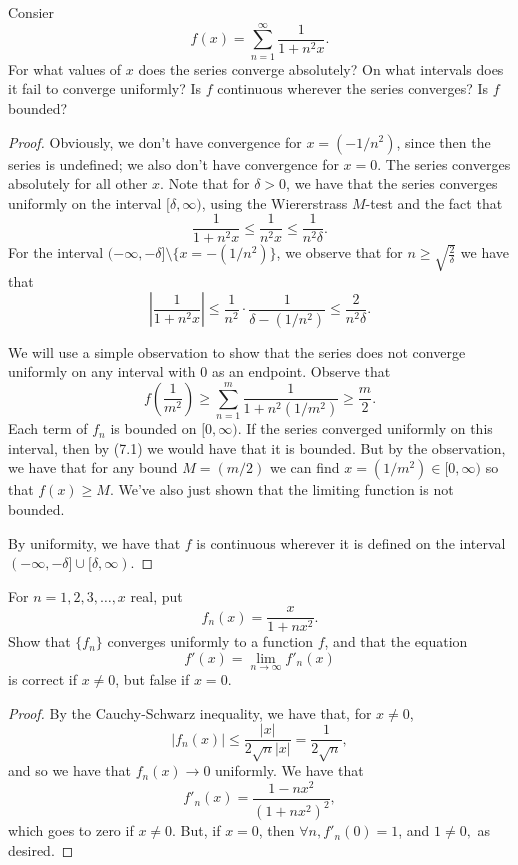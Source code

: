 \documentclass{assignment}
\begin{document}
\begin{question}[7.4]
 Consier $$f(x) = \sum_{n=1}^\infty \frac{1}{1+n^2x}.$$ For what values of $x$ does the series
converge absolutely? On what intervals does it fail to converge uniformly? Is $f$ continuous
wherever the series converges? Is $f$ bounded? 
\end{question}
\begin{proof}
 Obviously, we don't have convergence for $x = (-1 / n^2)$, since then the series is undefined; we
also don't have convergence for $x = 0$. The series converges absolutely for all other $x$. Note
that for $\delta > 0$, we have that the series converges uniformly on the interval $[\delta,
\infty)$, using the Wiererstrass $M$-test and the fact that 
$$\frac{1}{1 + n^2x} \leq \frac{1}{n^2x} \leq \frac{1}{n^2\delta}.$$
For the interval $(-\infty, -\delta] \setminus \{x = -(1/n^2)\}$, we observe that for $n \geq
\sqrt{\frac{2}{\delta}}$ we have that 
$$\left| \frac{1}{1+n^2x} \right| \leq \frac{1}{n^2}\cdot \frac{1}{\delta - (1/n^2)} \leq
\frac{2}{n^2\delta}.$$

We will use a simple observation to show that the series does not converge uniformly on any interval
with 0 as an endpoint. Observe that 
$$f \left( \frac{1}{m^2} \right) \geq \sum_{n=1}^m \frac{1}{1 + n^2(1/m^2)} \geq \frac{m}{2}.$$
Each term of $f_n$ is bounded on $[0, \infty)$. If the series converged uniformly on this interval,
then by (7.1) we would have that it is bounded. But by the observation, we have that for any bound
$M = (m/2)$ we can find $x = (1/m^2) \in [0, \infty)$ so that $f(x) \geq M$. We've also just shown
that the limiting function is not bounded. 

By uniformity, we have that $f$ is continuous wherever it is defined on the interval $(-\infty,
-\delta] \cup [\delta, \infty)$. 
\end{proof}

\begin{question}[7.7]
 For $n=1,2,3, \ldots, x$ real, put $$f_n(x) = \frac{x}{1 + nx^2}.$$ Show that $\{f_n\}$ converges
uniformly to a function $f$, and that the equation $$f'(x) = \lim_{n\to\infty} f'_n(x)$$ is correct
if $x\neq 0$, but false if $x=0$.
\end{question}
\begin{proof}
  By the Cauchy-Schwarz inequality, we have that, for $x \neq 0$,
$$|f_n(x)| \leq \frac{|x|}{2\sqrt{n}|x|} = \frac{1}{2\sqrt{n}},$$
and so we have that $f_n(x) \to 0$ uniformly. We have that $$f'_n(x) = \frac{1 - nx^2}{(1 +
nx^2)^2},$$ which goes to zero if $x\neq 0$. But, if $x = 0$, then $\forall n, f'_n(0) = 1$, and $1
\neq 0,$ as desired.
\end{proof}
\end{document}
